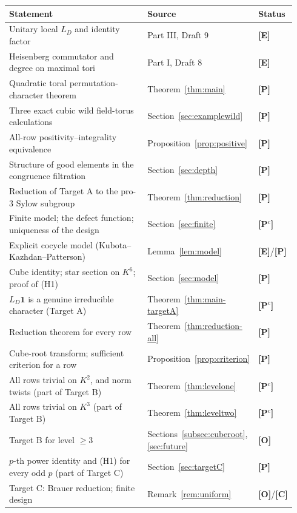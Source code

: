 \documentclass[11pt]{article}
\newcommand{\Ptag}{\textnormal{\textbf{[P]}}}
\newcommand{\Pctag}{\textnormal{\textbf{[P$^{\mathrm c}$]}}}
\newcommand{\Etag}{\textnormal{\textbf{[E]}}}
\newcommand{\Otag}{\textnormal{\textbf{[O]}}}
\newcommand{\Ctag}{\textnormal{\textbf{[C]}}}
\theoremstyle{plain}
\theoremstyle{definition}
\begin{document}
\begin{center}\small
\begin{tabular}{@{}p{0.60\linewidth}p{0.26\linewidth}p{0.08\linewidth}@{}}
\toprule
Statement & Source & Status\\\midrule
Unitary local $L_D$ and identity factor & Part III, Draft 9 & \Etag\\
Heisenberg commutator and degree on maximal tori & Part I, Draft 8 & \Etag\\
Quadratic toral permutation-character theorem & Theorem~\ref{thm:main} & \Ptag\\
Three exact cubic wild field-torus calculations & Section~\ref{sec:examplewild} & \Ptag\\
All-row positivity--integrality equivalence & Proposition~\ref{prop:positive} & \Ptag\\
Structure of good elements in the congruence filtration & Section~\ref{sec:depth} & \Ptag\\
Reduction of Target A to the pro-$3$ Sylow subgroup & Theorem~\ref{thm:reduction} & \Ptag\\
Finite model; the defect function; uniqueness of the design & Section~\ref{sec:finite} & \Pctag\\
Explicit cocycle model (Kubota--Kazhdan--Patterson) & Lemma~\ref{lem:model} & \Etag/\Ptag\\
Cube identity; star section on $K^6$; proof of (H1) & Section~\ref{sec:model} & \Ptag\\
$L_D\mathbf1$ is a genuine irreducible character (Target A) & Theorem~\ref{thm:main-targetA} & \Pctag\\
Reduction theorem for every row & Theorem~\ref{thm:reduction-all} & \Ptag\\
Cube-root transform; sufficient criterion for a row & Proposition~\ref{prop:criterion} & \Ptag\\
All rows trivial on $K^2$, and norm twists (part of Target B) & Theorem~\ref{thm:levelone} & \Pctag\\
All rows trivial on $K^3$ (part of Target B) & Theorem~\ref{thm:leveltwo} & \Pctag\\
Target B for level $\ge3$ & Sections~\ref{subsec:cuberoot}, \ref{sec:future} & \Otag\\
$p$-th power identity and (H1) for every odd $p$ (part of Target C) & Section~\ref{sec:targetC} & \Ptag\\
Target C: Brauer reduction; finite design & Remark~\ref{rem:uniform} & \Otag/\Ctag\\
\bottomrule
\end{tabular}
\end{center}
\end{document}

